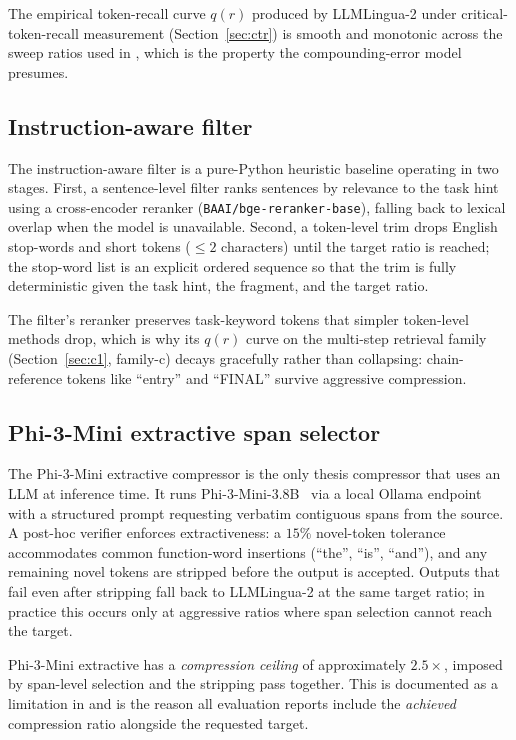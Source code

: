 The empirical token-recall curve $q(r)$ produced by LLMLingua-2
under critical-token-recall measurement (Section~\ref{sec:ctr})
is smooth and monotonic across the sweep ratios used in
, which is the property the
compounding-error model presumes.

\subsection{Instruction-aware filter}

The instruction-aware filter is a pure-Python heuristic baseline operating in two stages. First, a sentence-level filter ranks sentences by relevance to the task hint using a cross-encoder reranker (\texttt{BAAI/bge-reranker-base}), falling back to lexical overlap when the model is unavailable. Second, a token-level trim drops English stop-words and short tokens ($\le 2$ characters) until the target ratio is reached; the stop-word list is an explicit ordered sequence so that the trim is fully deterministic given the task hint, the fragment, and the target ratio.

The filter's reranker preserves task-keyword tokens that simpler
token-level methods drop, which is why its $q(r)$ curve on the
multi-step retrieval family (Section~\ref{sec:c1}, family-c) decays
gracefully rather than collapsing: chain-reference tokens like
``entry'' and ``FINAL'' survive aggressive compression.

\subsection{Phi-3-Mini extractive span selector}
\label{sec:phi3}

The Phi-3-Mini extractive compressor is the only thesis compressor
that uses an LLM at inference time. It runs Phi-3-Mini-3.8B~\cite{phi3}
via a local Ollama endpoint~\cite{ollama} with a structured prompt
requesting verbatim contiguous spans from the source. A post-hoc
verifier enforces extractiveness: a $15\%$ novel-token tolerance
accommodates common function-word insertions
(``the'', ``is'', ``and''), and any remaining novel tokens are
stripped before the output is accepted. Outputs that fail even after
stripping fall back to LLMLingua-2 at the same target ratio; in
practice this occurs only at aggressive ratios where span selection
cannot reach the target.

Phi-3-Mini extractive has a \emph{compression ceiling} of
approximately $2.5\times$, imposed by span-level selection and the
stripping pass together. This is documented as a limitation in
 and is the reason all evaluation reports include
the \emph{achieved} compression ratio alongside the requested target.

